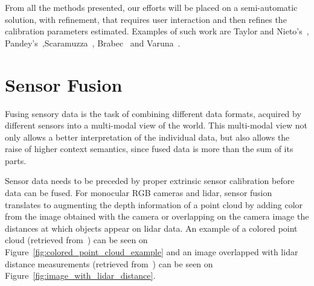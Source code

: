 From all the methods presented, our efforts will be placed on a semi-automatic solution, with refinement, that requires user interaction and then refines the calibration parameters estimated. Examples of such work are Taylor and Nieto's~\cite{Taylor2013}, Pandey's~\cite{Pandey2012},Scaramuzza~\cite{Scaramuzza}, Brabec~\cite{brabec2014} and Varuna~\cite{DeSilva2018}.


\section{Sensor Fusion}
\label{sec:sota:sensor-fusion}
Fusing sensory data is the task of combining different data formats, acquired by different sensors into a multi-modal view of the world. This multi-modal view not only allows a better interpretation of the individual data, but also allows the raise of higher context semantics, since fused data is more than the sum of its parts.

Sensor data needs to be preceded by proper extrinsic sensor calibration before data can be fused. For monocular RGB cameras and \ac{lidar}, sensor fusion translates to augmenting the depth information of a point cloud by adding color from the image obtained with the camera or overlapping on the camera image the distances at which objects appear on \ac{lidar} data. An example of a colored point cloud (retrieved from~\cite{Gong2013}) can be seen on Figure~\ref{fig:colored_point_cloud_example} and an image overlapped with \ac{lidar} distance measurements (retrieved from~\cite{Bileschi2009}) can be seen on Figure~\ref{fig:image_with_lidar_distance}.

